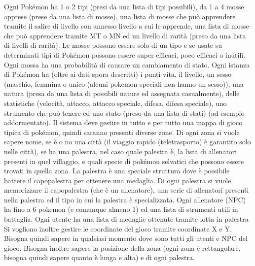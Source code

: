 \documentclass{article}
\begin{document}
Ogni Pokémon ha 1 o 2 tipi (presi da una lista di tipi possibili), da 1 a 4 mosse apprese (prese da una lista di mosse), una lista di mosse che può apprendere tramite il salire di livello con annesso livello a cui le apprende, una lista di mosse che può apprendere tramite MT o MN ed un livello di rarità (preso da una lista di livelli di rarità). 
Le mosse possono essere solo di un tipo e se usate su determinati tipi di Pokémon possono essere super efficaci, poco efficaci o inutili.
Ogni mossa ha una probabilità di causare un cambiamento di stato.
Ogni istanza di Pokémon ha (oltre ai dati spora descritti) i punti vita, il livello, un sesso (maschio, femmina o unico (alcuni pokemon speciali non hanno un sesso)), una natura (presa da una lista di possibili nature ed assegnata casualmente), delle statistiche (velocità, attacco, attacco speciale, difesa, difesa speciale), uno strumento che può tenere ed uno stato (preso da una lista di stati) (ad esempio addormentato).
Il sistema deve gestire in tutto e per tutto una mappa di gioco tipica di pokémon, quindi saranno presenti diverse zone.
Di ogni zona si vuole sapere nome, se è o no una città (il viaggio rapido (teletrasporto) è garantito solo nelle città), se ha una palestra, nel caso quale palestra è, la lista di allenatori presenti in quel villaggio, e quali specie di pokémon selvatici che possono essere trovati in quella zona.
La palestra è una speciale struttura dove è possibile battere il capopalestra per ottenere una medaglia.
Di ogni palestra si vuole memorizzare il capopalestra (che è un allenatore), una serie di allenatori presenti nella palestra ed il tipo in cui la palestra è specializzata.
Ogni allenatore (NPC) ha fino a 6 pokemon (e comunque almeno 1) ed una lista di strumenti utili in battaglia.
Ogni utente ha una lista di medaglie ottenute tramite lotta in palestra
Si vogliono inoltre gestire le coordinate del gioco tramite coordinate X e Y.
Bisogna quindi sapere in qualsiasi momento dove sono tutti gli utenti e NPC del gioco.
Bisogna inoltre sapere la posizione della zona (ogni zona è rettangolare, bisogna quindi sapere quanto è lunga e alta) e di ogni palestra.
\end{document}
